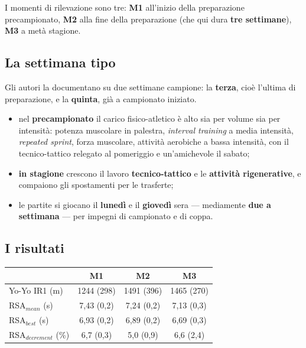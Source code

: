 I momenti di rilevazione sono tre: \textbf{M1} all'inizio della preparazione precampionato,
\textbf{M2} alla fine della preparazione (che qui dura \textbf{tre settimane}), \textbf{M3} a metà
stagione.

\subsection{La settimana tipo}

Gli autori la documentano su due settimane campione: la \textbf{terza}, cioè l'ultima di
preparazione, e la \textbf{quinta}, già a campionato iniziato.

\begin{itemize}
  \item nel \textbf{precampionato} il carico fisico-atletico è alto sia per volume sia per
    intensità: potenza muscolare in palestra, \textit{interval training} a media intensità,
    \textit{repeated sprint}, forza muscolare, attività aerobiche a bassa intensità, con il
    tecnico-tattico relegato al pomeriggio e un'amichevole il sabato;
  \item \textbf{in stagione} crescono il lavoro \textbf{tecnico-tattico} e le \textbf{attività
    rigenerative}, e compaiono gli spostamenti per le trasferte;
  \item le partite si giocano il \textbf{lunedì} e il \textbf{giovedì} sera --- mediamente
    \textbf{due a settimana} --- per impegni di campionato e di coppa.
\end{itemize}

\subsection{I risultati}

\begin{table}[htbp]
  \centering
  \small
  \renewcommand{\arraystretch}{1.3}
  \begin{tabularx}{\textwidth}{|X|c|c|c|}
    \hline
    & \textbf{M1} & \textbf{M2} & \textbf{M3} \\
    \hline
    Yo-Yo IR1 (m) & 1244 (298) & 1491 (396) & 1465 (270) \\
    \hline
    RSA$_{mean}$ (s) & 7,43 (0,2) & 7,24 (0,2) & 7,13 (0,3) \\
    \hline
    RSA$_{best}$ (s) & 6,93 (0,2) & 6,89 (0,2) & 6,69 (0,3) \\
    \hline
    RSA$_{decrement}$ (\%) & 6,7 (0,3) & 5,0 (0,9) & 6,6 (2,4) \\
    \hline
  \end{tabularx}
\end{table}

